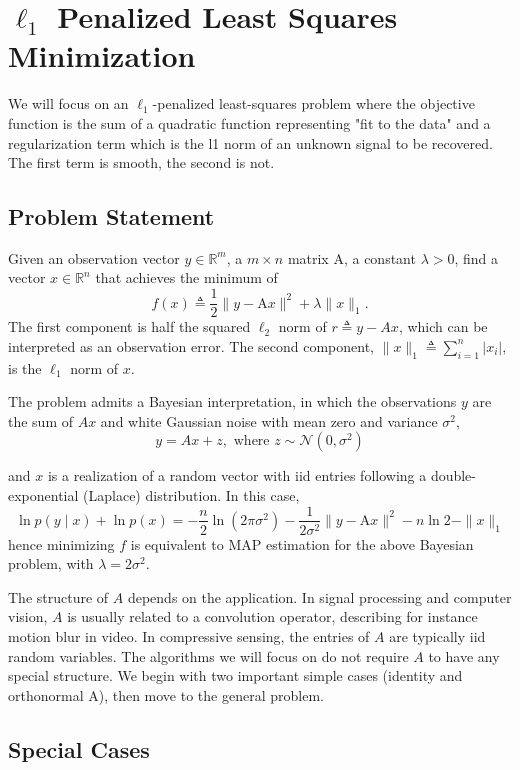 \documentclass[11pt]{elegantbook}
\begin{document}
\chapter{$\ell_1$ Penalized Least Squares Minimization}
We will focus on an $\ell_1$-penalized least-squares problem where the objective function is the sum of a quadratic function representing "fit to the data" and a regularization term which is the l1 norm of an unknown signal to be recovered. The first term is smooth, the second is not.

\section{Problem Statement}
Given an observation vector $y \in \mathbb{R}^m$, a $m \times n$ matrix $\mathrm{A}$, a constant $\lambda>0$, find a vector $x \in \mathbb{R}^n$ that achieves the minimum of
$$
f(x) \triangleq \frac{1}{2}\|y-\mathrm{A} x\|^2+\lambda\|x\|_1 .
$$
The first component is half the squared $\ell_2$ norm of $r \triangleq y-A x$, which can be interpreted as an observation error. The second component, $\|x\|_1 \triangleq \sum_{i=1}^n\left|x_i\right|$, is the $\ell_1$ norm of $x$.

The problem admits a Bayesian interpretation, in which the observations $y$ are the sum of $A x$ and white Gaussian noise with mean zero and variance $\sigma^2$, $$y=Ax+z,\text{ where }z\sim \mathcal{N}(0,\sigma^2)$$

and $x$ is a realization of a random vector with iid entries following a double-exponential (Laplace) distribution. In this case,
$$
\ln p(y \mid x)+\ln p(x)=-\frac{n}{2} \ln \left(2 \pi \sigma^2\right)-\frac{1}{2 \sigma^2}\|y-\mathrm{A} x\|^2-n \ln 2-\|x\|_1
$$
hence minimizing $f$ is equivalent to MAP estimation for the above Bayesian problem, with $\lambda=2 \sigma^2$.

The structure of $A$ depends on the application. In signal processing and computer vision, $A$ is usually related to a convolution operator, describing for instance motion blur in video. In compressive sensing, the entries of $A$ are typically iid random variables. The algorithms we will focus on do not require $A$ to have any special structure. We begin with two important simple cases (identity and orthonormal A), then move to the general problem.

\section{Special Cases}
\end{document}
